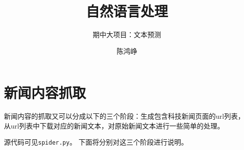 \documentclass[logo,reportComp]{thesis}
\title{自然语言处理}
\subtitle{期中大项目：文本预测}
\author{陈鸿峥}
\begin{document}
\maketitle
\tableofcontents

\newpage
\section{新闻内容抓取}

新闻内容的抓取又可以分成以下的三个阶段：生成包含科技新闻页面的url列表，从url列表中下载对应的新闻文本，对原始新闻文本进行一些简单的处理。

源代码可见\verb'spider.py'。
下面将分别对这三个阶段进行说明。
\end{document}
